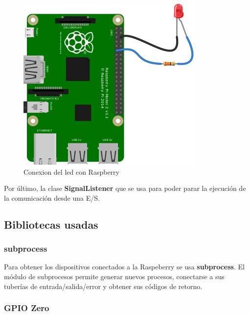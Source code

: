 {\begin{figure}[p]
    \centering
    \includegraphics[width=\linewidth]{imagenes/led_bb.png}
    \caption{Conexion del led con Raspberry \cite{raspberry-led}}
    \label{fig:figure12}
\end{figure}

Por último, la clase \textbf{SignalListener} que se usa para poder parar la ejecución de la comunicación desde una E/S. \\

\subsection{Bibliotecas usadas}

\subsubsection{subprocess}

Para obtener los dispositivos conectados a la Raspeberry se usa \textbf{subprocess}. El módulo de subprocesos permite generar nuevos procesos, conectarse a sus tuberías de entrada/salida/error y obtener sus códigos de retorno. \cite{subprocess}

\subsubsection{GPIO Zero}

}
